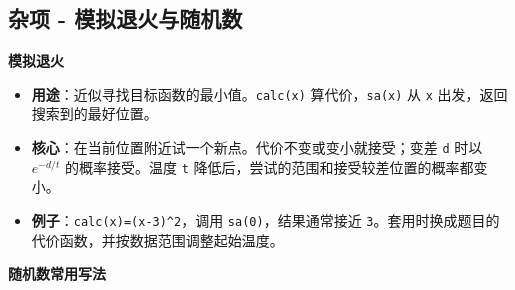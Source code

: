 \documentclass[10pt,landscape,a4paper]{article}
\begin{document}
\begin{multicols*}{3}
\subsection*{杂项 - 模拟退火与随机数}
\par\addvspace{0.7ex}\noindent\textbf{模拟退火}\par\nobreak
\begin{itemize}
\item \textbf{用途}：近似寻找目标函数的最小值。\texttt{c\allowbreak{}a\allowbreak{}l\allowbreak{}c\allowbreak{}(\allowbreak{}x\allowbreak{})} 算代价，\texttt{s\allowbreak{}a\allowbreak{}(\allowbreak{}x\allowbreak{})} 从 \texttt{x} 出发，返回搜索到的最好位置。
\item \textbf{核心}：在当前位置附近试一个新点。代价不变或变小就接受；变差 \texttt{d} 时以 $e^{-d/t}$ 的概率接受。温度 \texttt{t} 降低后，尝试的范围和接受较差位置的概率都变小。
\item \textbf{例子}：\texttt{c\allowbreak{}a\allowbreak{}l\allowbreak{}c\allowbreak{}(\allowbreak{}x\allowbreak{})\allowbreak{}=\allowbreak{}(\allowbreak{}x\allowbreak{}-\allowbreak{}3\allowbreak{})\allowbreak{}\textasciicircum{}\allowbreak{}2}，调用 \texttt{s\allowbreak{}a\allowbreak{}(\allowbreak{}0\allowbreak{})}，结果通常接近 \texttt{3}。套用时换成题目的代价函数，并按数据范围调整起始温度。
\end{itemize}
\par\addvspace{0.7ex}\noindent\textbf{随机数常用写法}\par\nobreak

\end{multicols*}
\end{document}
